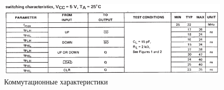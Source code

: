 \begin{figure}[H]
	\centering
	\includegraphics[width=0.95\linewidth]{imgs/14/14_switch}
	\caption{Коммутационные характеристики}
	\label{fig:14_switch}
\end{figure}
